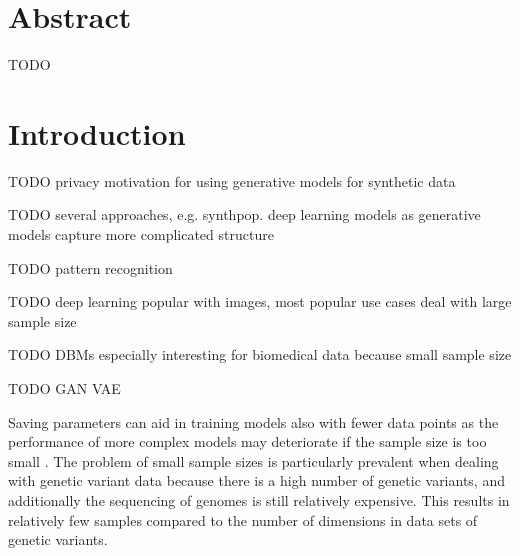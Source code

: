 \documentclass[12pt]{article}
\begin{document}



\tableofcontents
\newpage
\onehalfspacing
\setlength{\emergencystretch}{3em}

\section*{Abstract}
TODO

\clearpage
\section{Introduction}
TODO privacy motivation for using generative models for synthetic data

TODO several approaches, e.g. synthpop. deep learning models as generative models capture more complicated structure

TODO pattern recognition

TODO deep learning popular with images, most popular use cases deal with large sample size

TODO DBMs especially interesting for biomedical data because small sample size

TODO GAN VAE

Saving parameters can aid in training models also with fewer data points as the performance of more complex models may deteriorate if the sample size is too small \citep{chan_classifier_1999}.
The problem of small sample sizes is particularly prevalent when dealing with genetic variant data 
because there is a high number of genetic variants, and additionally the sequencing of genomes is still relatively expensive.
This results in relatively few samples compared to the number of dimensions in data sets of genetic variants.
\end{document}
